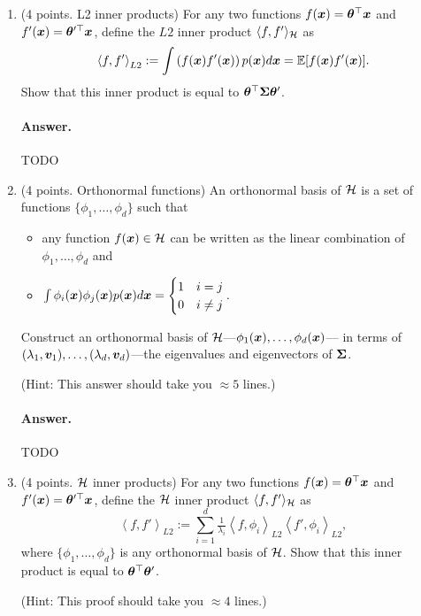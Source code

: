 \documentclass[11pt,letterpaper]{article}
\newenvironment{answer}{%
    \vspace{1em}
    \color{black}
    \paragraph{Answer.}
  }{%
    \vspace{1em}
  }
\begin{document}
\begin{enumerate}

  \item (4 points. L2 inner products)
    For any two functions $f({\bm{x}}) = {\bm{\theta}}^\top {\bm{x}}$ and $f'({\bm{x}}) = {\bm{\theta}}^{\prime\top} {\bm{x}}$,
    define the $L2$ inner product $\langle f, f' \rangle_{\mathcal{H}}$ as
    $$ \left\langle f, f' \right\rangle_{L2} := \int \left( f({\bm{x}}) f'({\bm{x}}) \right) p({\bm{x}}) d{\bm{x}} = \mathbb{E}[ f({\bm{x}}) f'({\bm{x}}) ]. $$
    Show that this inner product is equal to ${\bm{\theta}}^\top {\bm{\Sigma}} {\bm{\theta}}'$.

\begin{answer}
  TODO
\end{answer}

  \item (4 points. Orthonormal functions)
    An orthonormal basis of $\mathcal{H}$ is a set of functions $\{ \phi_1, \ldots, \phi_d \}$ such that
    \begin{itemize}
      \item any function $f({\bm{x}}) \in \mathcal{H}$ can be written as the linear combination of $\phi_1, \ldots, \phi_d$ and
      \item $\int \phi_i({\bm{x}}) \phi_j({\bm{x}}) p({\bm{x}}) d{\bm{x}} = \begin{cases} 1 & i=j \\ 0 & i \ne j \end{cases}.$
    \end{itemize}
    Construct an orthonormal basis of $\mathcal{H}$---$\phi_1({\bm{x}}), \ldots, \phi_d({\bm{x}})$---%
    in terms of $(\lambda_1, {\bm{v}}_1), \ldots, (\lambda_d, {\bm{v}}_d)$---the eigenvalues and eigenvectors of ${\bm{\Sigma}}$.

    (Hint: This answer should take you $\approx 5$ lines.)

\begin{answer}
  TODO
\end{answer}

  \item (4 points. $\mathcal{H}$ inner products)
    For any two functions $f({\bm{x}}) = {\bm{\theta}}^\top {\bm{x}}$ and $f'({\bm{x}}) = {\bm{\theta}}^{\prime\top} {\bm{x}}$,
    define the $\mathcal{H}$ inner product $\langle f, f' \rangle_{\mathcal{H}}$ as
    $$ \left\langle f, f' \right\rangle_{L2} := \sum_{i=1}^d
      \tfrac{1}{\lambda_i}
      \left\langle f, \phi_i \right\rangle_{L2}
      \left\langle f', \phi_i \right\rangle_{L2},
    $$
    where $\{ \phi_1, \ldots, \phi_d \}$ is any orthonormal basis of $\mathcal{H}$.
    Show that this inner product is equal to ${\bm{\theta}}^\top {\bm{\theta}}'$.

    (Hint: This proof should take you $\approx 4$ lines.)


\end{enumerate}
\end{document}
